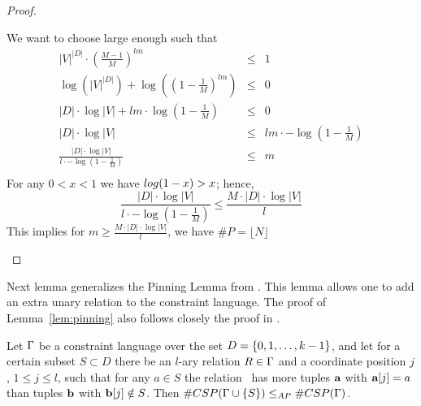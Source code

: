 \begin{proof}
\begin{itemize}
We want to choose large enough such that
\begin{eqnarray*}
|V|^{|D|} \cdot \left(\frac{M-1}{M}\right)^{lm} & \le & 1 \\
\log (|V|^{|D|}) + \log\left( \left(1-\frac{1}{M}\right)^{lm} \right) & \le &  0 \\
|D| \cdot \log |V| + lm \cdot \log \left(1-\frac{1}{M}\right) & \le & 0 \\ 
|D| \cdot \log |V| & \le & lm \cdot -\log \left(1-\frac{1}{M}\right) \\ 
\frac{|D| \cdot \log |V|}{l\cdot -\log \left(1-\frac{1}{M}\right)} & \le & m \\
\end{eqnarray*}
For any \(0<x<1\) we have \(\-log (1-x) > x \); hence, 
\[
\frac{|D| \cdot \log |V|}{l\cdot -\log \left(1-\frac{1}{M}\right)} \le 
\frac{M \cdot |D| \cdot \log |V|}{l}
\]
This implies for \(m \ge \frac{M \cdot |D| \cdot \log |V|}{l}\), we have 
\(\#P=\lfloor N \rfloor\)

\end{itemize}
\end{proof}


Next lemma generalizes the Pinning Lemma from
\cite{Trichotomy}. This lemma allows one to add an extra unary relation to the constraint language. 
The proof of Lemma~\ref{lem:pinning} also follows closely the proof in \cite{Trichotomy}. 

\begin{lemma}\label{lem:pinning}
Let \(\Gamma\) be a constraint language over the set \(D=\{{0,1,\dotsc,k-1}\}\)\@,
and let for a certain subset \(S \subset D\) 
there be an \(l\)-ary relation \(R \in \Gamma\) and a coordinate position \(j\),
\(1 \le j \le l\), such that for any \(a\in S\) the relation \mR\ has more tuples
\(\textbf{a}\) with \(\textbf{a}[j]=a\) than tuples \(\textbf{b}\) with
\(\textbf{b}[j] \notin S\)\@. Then \(\#CSP(\Gamma \cup \{{S}\}) \le_{AP} \#CSP(\Gamma)\)\@.
\end{lemma}

